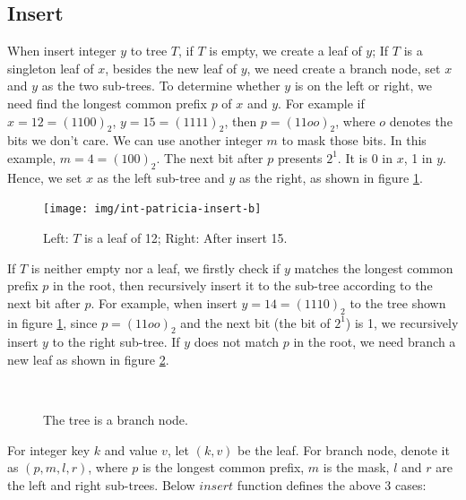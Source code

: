 \documentclass[b5paper]{article}
\begin{document}
\subsection{Insert}
When insert integer $y$ to tree $T$, if $T$ is empty, we create a leaf of $y$; If $T$ is a singleton leaf of $x$, besides the new leaf of $y$, we need create a branch node, set $x$ and $y$ as the two sub-trees. To determine whether $y$ is on the left or right, we need find the longest common prefix $p$ of $x$ and $y$. For example if $x = 12 = (1100)_2$, $y = 15 = (1111)_2$, then $p = (11oo)_2$, where $o$ denotes the bits we don't care. We can use another integer $m$ to mask those bits. In this example, $m = 4 = (100)_2$. The next bit after $p$ presents $2^1$. It is 0 in $x$, 1 in $y$. Hence, we set $x$ as the left sub-tree and $y$ as the right, as shown in figure \ref{fig:int-patricia-insert-b}.

\begin{figure}[htbp]
  \centering
  \texttt{[image: img/int-patricia-insert-b]}
  \caption{Left: $T$ is a leaf of 12; Right: After insert 15.}
  \label{fig:int-patricia-insert-b}
\end{figure}

If $T$ is neither empty nor a leaf, we firstly check if $y$ matches the longest common prefix $p$ in the root, then recursively insert it to the sub-tree according to the next bit after $p$. For example, when insert $y = 14 = (1110)_2$ to the tree shown in figure \ref{fig:int-patricia-insert-b}, since $p = (11oo)_2$ and the next bit (the bit of $2^1$) is 1, we recursively insert $y$ to the right sub-tree. If $y$ does not match $p$ in the root, we need branch a new leaf as shown in figure \ref{fig:int-patricia-insert-c}.

\begin{figure}[htbp]
  \centering
  \\
  \caption{The tree is a branch node.}
  \label{fig:int-patricia-insert-c}
\end{figure}

For integer key $k$ and value $v$, let $(k, v)$ be the leaf. For branch node, denote it as $(p, m, l, r)$, where $p$ is the longest common prefix, $m$ is the mask, $l$ and $r$ are the left and right sub-trees. Below $insert$ function defines the above 3 cases:
\end{document}
